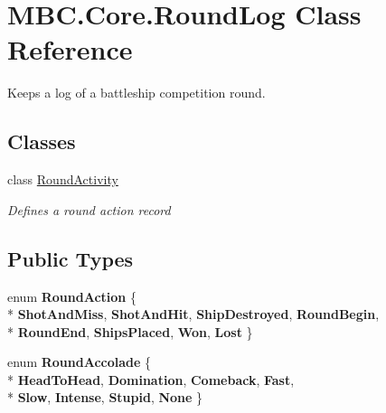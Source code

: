 \hypertarget{class_m_b_c_1_1_core_1_1_round_log}{\section{M\-B\-C.\-Core.\-Round\-Log Class Reference}
\label{class_m_b_c_1_1_core_1_1_round_log}
}


Keeps a log of a battleship competition round. 


\subsection*{Classes}
\begin{DoxyCompactItemize}
\item 
class \hyperlink{class_m_b_c_1_1_core_1_1_round_log_1_1_round_activity}{Round\-Activity}
\begin{DoxyCompactList}\small\item\em Defines a round action record\end{DoxyCompactList}\end{DoxyCompactItemize}
\subsection*{Public Types}
\begin{DoxyCompactItemize}
\item 
enum {\bfseries Round\-Action} \{ \\*
{\bfseries Shot\-And\-Miss}, 
{\bfseries Shot\-And\-Hit}, 
{\bfseries Ship\-Destroyed}, 
{\bfseries Round\-Begin}, 
\\*
{\bfseries Round\-End}, 
{\bfseries Ships\-Placed}, 
{\bfseries Won}, 
{\bfseries Lost}
 \}
\item 
enum {\bfseries Round\-Accolade} \{ \\*
{\bfseries Head\-To\-Head}, 
{\bfseries Domination}, 
{\bfseries Comeback}, 
{\bfseries Fast}, 
\\*
{\bfseries Slow}, 
{\bfseries Intense}, 
{\bfseries Stupid}, 
{\bfseries None}
 \}
\end{DoxyCompactItemize}
